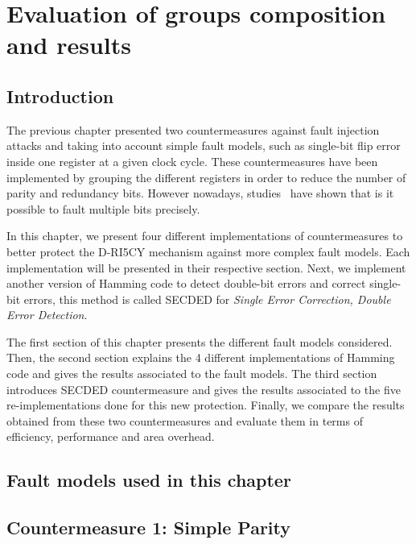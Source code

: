 \chapter{Evaluation of groups composition and results}
\label{chapter:exp_setup_results}
\minitoc

\section{Introduction}
The previous chapter presented two countermeasures against fault injection attacks and taking into account simple fault models, such as single-bit flip error inside one register at a given clock cycle. These countermeasures have been implemented by grouping the different registers in order to reduce the number of parity and redundancy bits. However nowadays, studies~\cite{CGVCBLC-22-cardis,VDSPB-24-jce} have shown that is it possible to fault multiple bits precisely.

In this chapter, we present four different implementations of countermeasures to better protect the D-RI5CY mechanism against more complex fault models. Each implementation will be presented in their respective section. Next, we implement another version of Hamming code to detect double-bit errors and correct single-bit errors, this method is called SECDED for \textit{Single Error Correction, Double Error Detection}.

The first section of this chapter presents the different fault models considered. Then, the second section explains the 4 different implementations of Hamming code and gives the results associated to the fault models. The third section introduces SECDED countermeasure and gives the results associated to the five re-implementations done for this new protection. Finally,  we compare the results obtained from these two countermeasures and evaluate them in terms of efficiency, performance and area overhead.

\section{Fault models used in this chapter}


\section{Countermeasure 1: Simple Parity}

